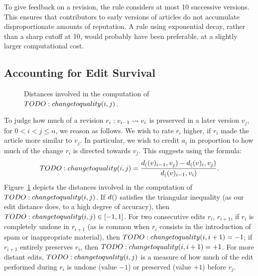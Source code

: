 To give feedback on a revision, the rule considers at most 10
successive versions. 
This ensures that contributors to early versions of articles do not
accumulate disproportionate amounts of reputation. 
A rule using exponential decay, rather than a sharp cutoff at 10,
would probably have been preferable, at a slightly larger
computational cost. 

\subsection{Accounting for Edit Survival}

\iflong
\begin{figure}
\begin{center}

\end{center}
\vspace*{-3ex}
\caption{Distances involved in the computation of $TODO: change to quality(i,j)$.}
\label{fig-triangle}
\end{figure}
\fi 

To judge how much of a revision $r_i: v_{i-1} \rightsquigarrow v_i$ is preserved
in a later version $v_j$, for $0 < i < j \leq n$, we reason as
follows. 
We wish to rate $r_i$ higher, if $r_i$ made the article more similar to
$v_j$. 
In particular, we wish to credit $a_i$ in proportion to how much of
the change $r_i$ is directed towards $v_j$. 
This suggests using the formula: 
%
\begin{equation} \label{eq-edit-long} 
  \elong(i,j) =
  \frac{\dist(v_{i-1},v_j) - \dist(v_{i},v_j)}{\dist(v_{i-1},v_i)} . 
\end{equation}
%
\iflong
Figure~\ref{fig-triangle} depicts the distances involved in the
computation of $TODO: change to quality(i,j)$. 
\fi
If $d_{}()$ satisfies the triangular inequality (as our edit distance
does, to a high degree of accuracy), then $TODO: change to quality(i,j) \in [-1,1]$.  
For two consecutive edits $r_i$, $r_{i+1}$,
if $r_i$ is completely undone in $r_{i+1}$ 
(as is common when $r_i$ consists in the introduction of spam or
inappropriate material), then $TODO: change to quality(i,i+1) = -1$; 
if $r_{i+1}$ entirely preserves $r_i$, then $TODO: change to quality(i,i+1) = +1$.
For more distant edits, $TODO: change to quality(i,j)$ is a measure of how much of the
edit performed during $r_i$ is undone (value $-1$) or preserved (value
$+1$) before $r_j$. 

